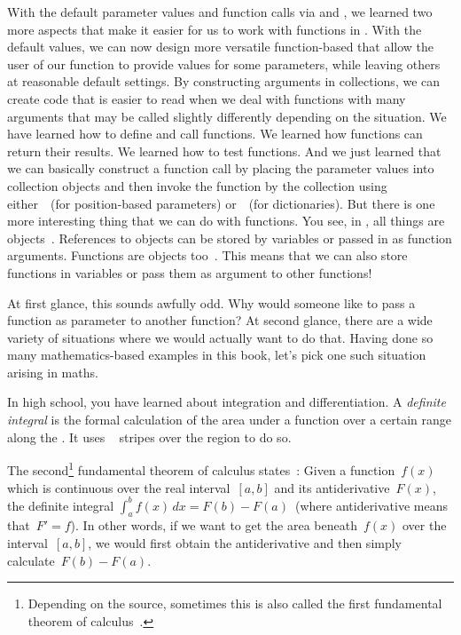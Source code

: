 With the default parameter values and function calls via \pythonil{*} and \pythonil{**}, we learned two more aspects that make it easier for us to work with functions in \python.
With the default values, we can now design more versatile function-based  that allow the user of our function to provide values for some parameters, while leaving others at reasonable default settings.
By constructing arguments in collections, we can create code that is easier to read when we deal with functions with many arguments that may be called slightly differently depending on the situation.%
\FloatBarrier%
\endhsection%
%
%
\label{sec:functionsAsVarsAndLambdas}%
%
We have learned how to define and call functions.
We learned how functions can return their results.
We learned how to test functions.
And we just learned that we can basically construct a function call by placing the parameter values into collection objects and then invoke the function by  the collection using either~\pythonil{*}~(for position-based parameters) or~\pythonil{**}~(for dictionaries).
But there is one more interesting thing that we can do with functions.
You see, in \python, all things are objects~\cite{H2025PM:EIAO,PSF:P3D:TPLR:DM}.
References to objects can be stored by variables or passed in as function arguments.
Functions are objects too~\cite{H2025PM:EIAO}.
This means that we can also store functions in variables or pass them as argument to other functions!

At first glance, this sounds awfully odd.
Why would someone like to pass a function as parameter to another function?
At second glance, there are a wide variety of situations where we would actually want to do that.
Having done so many mathematics-based examples in this book, let's pick one such situation arising in maths.

In high school, you have learned about integration and differentiation.
A \emph{definite integral} is the formal calculation of the area under a function over a certain range along the .
It uses ~\cite{EOWM2025MWAMTD:I,KS2013LITFTMIATFFBTRAB} stripes over the region to do so.

The second\footnote{%
Depending on the source, sometimes this is also called the first fundamental theorem of calculus~\cite{W2024MAWWR:SFTOC}.%
} %
fundamental theorem of calculus states~\cite{W2024MAWWR:SFTOC,A1991C:1:PFATSFTOC}:
Given a function~$f(x)$ which is continuous over the real interval~$[a,b]$ and its antiderivative~$F(x)$, the definite integral $\int_a^b f(x)\,dx = F(b)-F(a)$~(where antiderivative means that~$F'=f$).
In other words, if we want to get the area beneath~$f(x)$ over the interval~$[a,b]$, we would first obtain the antiderivative and then simply calculate~$F(b)-F(a)$.

